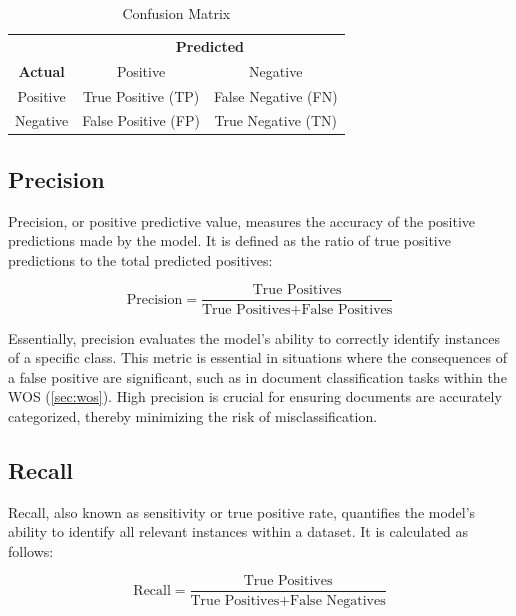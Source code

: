 \begin{table}[h]
    \centering
    \caption{Confusion Matrix}
    \begin{tabular}{|c|c|c|}
        \hline
                                          & \multicolumn{2}{c|}{\textbf{Predicted}}                       \\ \cline{2-3}
        \multirow{-2}{*}{\textbf{Actual}} & Positive                                & Negative            \\
        \hline
        Positive                          & True Positive (TP)                      & False Negative (FN) \\
        \hline
        Negative                          & False Positive (FP)                     & True Negative (TN)  \\
        \hline
    \end{tabular}

    \label{tab:confusion_matrix}
\end{table}


\subsection{Precision}

Precision, or positive predictive value, measures the accuracy of the positive predictions made by the model. It is defined as the ratio of true positive predictions to the total predicted positives:

$$
    \text{Precision} = \frac{\text{True Positives}}{\text{True Positives} + \text{False Positives}}
$$

Essentially, precision evaluates the model's ability to correctly identify instances of a specific class. This metric is essential in situations where the consequences of a false positive are significant, such as in document classification tasks within the WOS (\autoref{sec:wos}). High precision is crucial for ensuring documents are accurately categorized, thereby minimizing the risk of misclassification.

\subsection{Recall}

Recall, also known as sensitivity or true positive rate, quantifies the model's ability to identify all relevant instances within a dataset. It is calculated as follows:

$$
    \text{Recall} = \frac{\text{True Positives}}{\text{True Positives} + \text{False Negatives}}
$$

